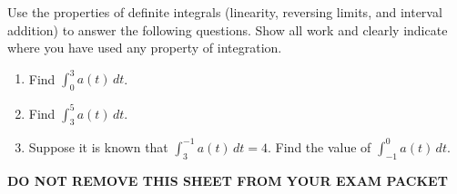 \documentclass[11pt]{article}
\begin{document}
\begin{enumerate}
Use the properties of definite integrals (linearity, reversing limits, and interval addition) to answer the following questions. Show all work and clearly indicate where you have used any property of integration.

\begin{enumerate}

\item Find $\displaystyle \int_0^3 a(t)\,dt$.  

\vfill

\item Find $\displaystyle \int_3^5 a(t)\,dt$.  

\vfill

\item Suppose it is known that $\displaystyle \int_{3}^{-1} a(t)\,dt = 4$.  
Find the value of $\displaystyle \int_{-1}^{0} a(t)\,dt$.  

\vfill

\end{enumerate}


\newpage

\begin{center}
{\bf DO NOT REMOVE THIS SHEET FROM YOUR EXAM PACKET}
\end{center}


\end{enumerate}
\end{document}
